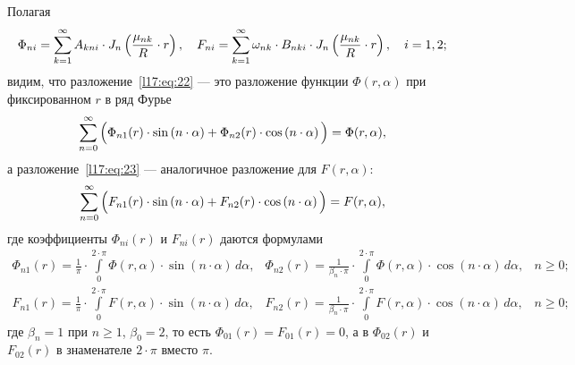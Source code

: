 Полагая 
\begin{equation}\label{l17:eq:24}
	\hfill\Phi_{ni}=\sum\limits_{k=1}^{\infty}A_{kni}\cdot J_{n}\left(\frac{\mu_{nk}}{R}\cdot r\right),\quad F_{ni}=\sum\limits_{k=1}^{\infty}\omega_{nk}\cdot B_{nki}\cdot J_{n}\left(\frac{\mu_{nk}}{R}\cdot r\right),\quad i=1,2;\hfill
\end{equation}
видим, что разложение~\eqref{l17:eq:22} --- это разложение функции $\Phi(r,\alpha)$ при фиксированном $r$ в ряд Фурье
\begin{equation*}
	\hfill\sum\limits_{n=0}^{\infty}\Big(\Phi_{n1}(r)\cdot\sin\left(n\cdot\alpha\right)+\Phi_{n2}(r)\cdot\cos\left(n\cdot\alpha\right)\Big)=\Phi(r,\alpha),\hfill
\end{equation*}
а разложение~\eqref{l17:eq:23} --- аналогичное разложение для $F(r,\alpha)$:
\begin{equation*}
	\hfill\sum\limits_{n=0}^{\infty}\Big(F_{n1}(r)\cdot\sin\left(n\cdot\alpha\right)+F_{n2}(r)\cdot\cos\left(n\cdot\alpha\right)\Big)=F(r,\alpha),\hfill
\end{equation*}
где коэффициенты $\Phi_{ni}(r)$ и $F_{ni}(r)$ даются формулами
\begin{equation}\label{l17:eq:25}
	\begin{array}{ccc}
		\displaystyle\Phi_{n1}(r)=\frac{1}{\pi}\cdot\int\limits_{0}^{2\cdot\pi}\Phi(r,\alpha)\cdot\sin\left(n\cdot\alpha\right)\,d\alpha,&\displaystyle\Phi_{n2}(r)=\frac{1}{\beta_n\cdot\pi}\cdot\int\limits_{0}^{2\cdot\pi}\Phi(r,\alpha)\cdot\cos\left(n\cdot\alpha\right)\,d\alpha,&n\geqslant0;\\[18pt]
		\displaystyle F_{n1}(r)=\frac{1}{\pi}\cdot\int\limits_{0}^{2\cdot\pi}F(r,\alpha)\cdot\sin\left(n\cdot\alpha\right)\,d\alpha,&\displaystyle F_{n2}(r)=\frac{1}{\beta_n\cdot\pi}\cdot\int\limits_{0}^{2\cdot\pi}F(r,\alpha)\cdot\cos\left(n\cdot\alpha\right)\,d\alpha,&n\geqslant0;
	\end{array}
\end{equation}
где $\beta_n=1$ при $n\geqslant1$, $\beta_0=2$, то есть $\Phi_{01}(r)=F_{01}(r)=0$, а в $\Phi_{02}(r)$ и $F_{02}(r)$ в знаменателе $2\cdot\pi$ вместо $\pi$.


